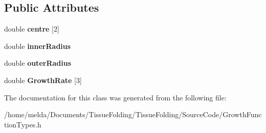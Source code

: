 \subsection*{Public Attributes}
\begin{DoxyCompactItemize}
\item 
\hypertarget{classRingGrowthFunction_a5b8f1cc72d03907bb1492e6c2f288db0}{}double {\bfseries centre} \mbox{[}2\mbox{]}\label{classRingGrowthFunction_a5b8f1cc72d03907bb1492e6c2f288db0}

\item 
\hypertarget{classRingGrowthFunction_a4e8796fbbbe9fe18c2dcd04613effcf0}{}double {\bfseries inner\+Radius}\label{classRingGrowthFunction_a4e8796fbbbe9fe18c2dcd04613effcf0}

\item 
\hypertarget{classRingGrowthFunction_a8b7d5268d9d47f112b56feef58193649}{}double {\bfseries outer\+Radius}\label{classRingGrowthFunction_a8b7d5268d9d47f112b56feef58193649}

\item 
\hypertarget{classRingGrowthFunction_a93b70ff6a7258c73a6bd2d888d09fc09}{}double {\bfseries Growth\+Rate} \mbox{[}3\mbox{]}\label{classRingGrowthFunction_a93b70ff6a7258c73a6bd2d888d09fc09}

\end{DoxyCompactItemize}


The documentation for this class was generated from the following file\+:\begin{DoxyCompactItemize}
\item 
/home/melda/\+Documents/\+Tissue\+Folding/\+Tissue\+Folding/\+Source\+Code/Growth\+Function\+Types.\+h\end{DoxyCompactItemize}
